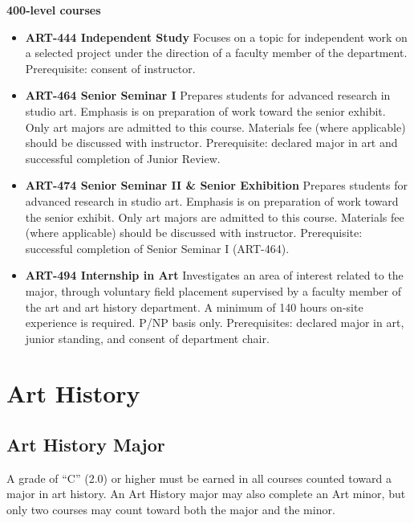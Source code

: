 \documentclass[
  letterpaper,
]{scrbook}
\providecommand{\tightlist}{%
  \setlength{\itemsep}{0pt}\setlength{\parskip}{0pt}}
\begin{document}
\textbf{400-level courses}

\begin{itemize}
\tightlist
\item
  \textbf{ART-444 Independent Study} Focuses on a topic for independent
  work on a selected project under the direction of a faculty member of
  the department. Prerequisite: consent of instructor.
\item
  \textbf{ART-464 Senior Seminar I} Prepares students for advanced
  research in studio art. Emphasis is on preparation of work toward the
  senior exhibit. Only art majors are admitted to this course. Materials
  fee (where applicable) should be discussed with instructor.
  Prerequisite: declared major in art and successful completion of
  Junior Review.
\item
  \textbf{ART-474 Senior Seminar II \& Senior Exhibition} Prepares
  students for advanced research in studio art. Emphasis is on
  preparation of work toward the senior exhibit. Only art majors are
  admitted to this course. Materials fee (where applicable) should be
  discussed with instructor. Prerequisite: successful completion of
  Senior Seminar I (ART-464).
\item
  \textbf{ART-494 Internship in Art} Investigates an area of interest
  related to the major, through voluntary field placement supervised by
  a faculty member of the art and art history department. A minimum of
  140 hours on-site experience is required. P/NP basis only.
  Prerequisites: declared major in art, junior standing, and consent of
  department chair.
\end{itemize}

\section{Art History}\label{art-history}

\subsection{Art History Major}\label{art-history-major}

A grade of ``C'' (2.0) or higher must be earned in all courses counted
toward a major in art history. An Art History major may also complete an
Art minor, but only two courses may count toward both the major and the
minor.
\end{document}
